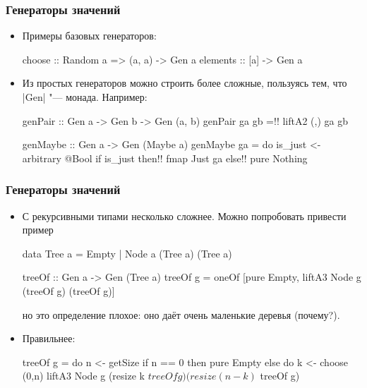\documentclass[11pt]{beamer}
\begin{document}
\begin{frame}[fragile]
  \frametitle{Генераторы значений}
  \begin{itemize}
    \item Примеры базовых генераторов:
          \begin{haskell}
            choose :: Random a => (a, a) -> Gen a
            elements :: [a] -> Gen a
          \end{haskell}
    \item Из простых генераторов можно строить более сложные, пользуясь тем, что \haskinline|Gen| "--- монада. Например:
          \begin{haskell}
            genPair :: Gen a -> Gen b -> Gen (a, b)
            genPair ga gb =!\pause! liftA2 (,) ga gb

            genMaybe :: Gen a -> Gen (Maybe a)
            genMaybe ga = do is_just <- arbitrary @Bool
                            if is_just 
                              then!\pause! fmap Just ga
                              else!\pause! pure Nothing
          \end{haskell}
  \end{itemize}
\end{frame}

\begin{frame}[fragile]
  \frametitle{Генераторы значений}
  \begin{itemize}
    \item С рекурсивными типами несколько сложнее. Можно попробовать привести пример
          \begin{haskelltiny}
            data Tree a = Empty | Node a (Tree a) (Tree a)

            treeOf :: Gen a -> Gen (Tree a)
            treeOf g = oneOf [pure Empty, 
                              liftA3 Node g (treeOf g) (treeOf g)]
          \end{haskelltiny}
          но это определение плохое: оно даёт очень маленькие деревья (почему?).
    \item Правильнее:
          \begin{haskelltiny}
            treeOf g = do n <- getSize
                          if n == 0
                            then pure Empty
                            else do
                              k <- choose (0,n)
                              liftA3 Node g (resize k $ treeOf g)
                                            (resize (n-k) $ treeOf g)
          \end{haskelltiny}
  \end{itemize}
\end{frame}
\end{document}
